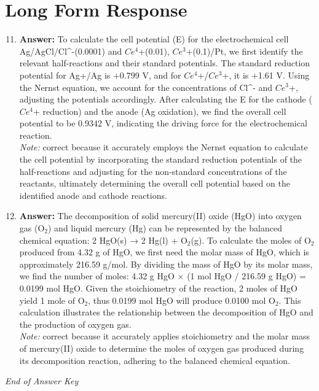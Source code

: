 \documentclass[12pt]{article}
\begin{document}
\section*{Long Form Response}
\begin{enumerate}[label=\arabic*.]
\setcounter{enumi}{10}
\item \textbf{Answer:} To calculate the cell potential (E) for the electrochemical cell Ag/AgCl/Cl^-(0.0001) and $Ce^4$+(0.01), $Ce^3$+(0.1)/Pt, we first identify the relevant half-reactions and their standard potentials. The standard reduction potential for Ag+/Ag is +0.799 V, and for $Ce^4$+/$Ce^3$+, it is +1.61 V. Using the Nernst equation, we account for the concentrations of Cl^- and $Ce^3$+, adjusting the potentials accordingly. After calculating the E for the cathode ($Ce^4$+ reduction) and the anode (Ag oxidation), we find the overall cell potential to be 0.9342 V, indicating the driving force for the electrochemical reaction.
\\ \textit{Note:} correct because it accurately employs the Nernst equation to calculate the cell potential by incorporating the standard reduction potentials of the half-reactions and adjusting for the non-standard concentrations of the reactants, ultimately determining the overall cell potential based on the identified anode and cathode reactions.
\item \textbf{Answer:} The decomposition of solid mercury(II) oxide (HgO) into oxygen gas (O$_{2}$) and liquid mercury (Hg) can be represented by the balanced chemical equation: 2 HgO(s) → 2 Hg(l) + O$_{2}$(g). To calculate the moles of O$_{2}$ produced from 4.32 g of HgO, we first need the molar mass of HgO, which is approximately 216.59 g/mol. By dividing the mass of HgO by its molar mass, we find the number of moles: 4.32 g HgO \ensuremath{\times} (1 mol HgO / 216.59 g HgO) = 0.0199 mol HgO. Given the stoichiometry of the reaction, 2 moles of HgO yield 1 mole of O$_{2}$, thus 0.0199 mol HgO will produce 0.0100 mol O$_{2}$. This calculation illustrates the relationship between the decomposition of HgO and the production of oxygen gas.
\\ \textit{Note:} correct because it accurately applies stoichiometry and the molar mass of mercury(II) oxide to determine the moles of oxygen gas produced during its decomposition reaction, adhering to the balanced chemical equation.
\end{enumerate}

\vfill
\noindent\textit{End of Answer Key}
\end{document}
